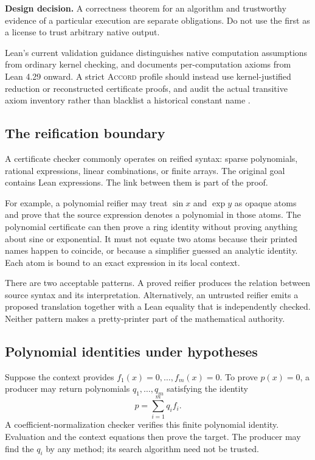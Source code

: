 \documentclass[11pt,a4paper]{article}
\newcommand{\Accord}{\textsc{Accord}}
\newcommand{\design}[1]{\par\smallskip\noindent\textbf{Design decision.} #1\par\smallskip}
\theoremstyle{definition}
\begin{document}
\design{A correctness theorem for an algorithm and trustworthy evidence of a
particular execution are separate obligations. Do not use the first as a license
to trust arbitrary native output.}

Lean's current validation guidance distinguishes native computation assumptions
from ordinary kernel checking, and documents per-computation axioms from Lean
4.29 onward. A strict \Accord{} profile should instead use kernel-justified
reduction or reconstructed certificate proofs, and audit the actual transitive
axiom inventory rather than blacklist a historical constant name
\cite{lean-validation}.

\subsection{The reification boundary}
A certificate checker commonly operates on reified syntax: sparse polynomials,
rational expressions, linear combinations, or finite arrays. The original goal
contains Lean expressions. The link between them is part of the proof.

For example, a polynomial reifier may treat $\sin x$ and $\exp y$ as opaque atoms
and prove that the source expression denotes a polynomial in those atoms. The
polynomial certificate can then prove a ring identity without proving anything
about sine or exponential. It must not equate two atoms because their printed
names happen to coincide, or because a simplifier guessed an analytic identity.
Each atom is bound to an exact expression in its local context.

There are two acceptable patterns. A proved reifier produces the relation
between source syntax and its interpretation. Alternatively, an untrusted
reifier emits a proposed translation together with a Lean equality that is
independently checked. Neither pattern makes a pretty-printer part of the
mathematical authority.

\subsection{Polynomial identities under hypotheses}
Suppose the context provides $f_1(x)=0,\ldots,f_m(x)=0$. To prove $p(x)=0$, a
producer may return polynomials $q_1,\ldots,q_m$ satisfying the identity
\begin{equation}
 p=\sum_{i=1}^{m}q_i f_i.
 \label{eq:idealcertificate}
\end{equation}
A coefficient-normalization checker verifies this finite polynomial identity.
Evaluation and the context equations then prove the target. The producer may
find the $q_i$ by any method; its search algorithm need not be trusted.
\end{document}
